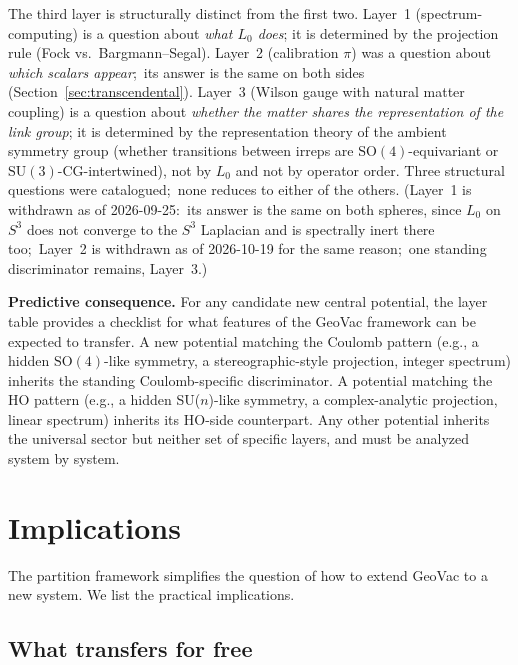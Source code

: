 \documentclass[twocolumn,pra,amsmath,amssymb,superscriptaddress]{revtex4-2}
\begin{document}
The third layer is structurally distinct from the first two.  Layer~1
(spectrum-computing) is a question about \emph{what $L_0$ does}; it
is determined by the projection rule (Fock vs.\ Bargmann--Segal).
Layer~2 (calibration $\pi$) was a question about \emph{which scalars
appear};\ its answer is the same on both sides
(Section~\ref{sec:transcendental}).  Layer~3 (Wilson gauge with
natural matter coupling) is a question about \emph{whether the matter
shares the representation of the link group}; it is determined by the
representation theory of the ambient symmetry group (whether
transitions between irreps are $\mathrm{SO}(4)$-equivariant or
$\mathrm{SU}(3)$-CG-intertwined), not by $L_0$ and not by operator
order.  Three structural questions were catalogued;\ none reduces to
either of the others.  (Layer~1 is withdrawn as of 2026-09-25:\ its
answer is the same on both spheres, since $L_0$ on $S^3$ does not
converge to the $S^3$ Laplacian and is spectrally inert there too;\
Layer~2 is withdrawn as of 2026-10-19 for the same reason;\ one
standing discriminator remains, Layer~3.)

\medskip\noindent\textbf{Predictive consequence.}  For any candidate
new central potential, the layer table provides a checklist
for what features of the GeoVac framework can be expected to
transfer.  A new potential matching the Coulomb pattern (e.g., a
hidden $\mathrm{SO}(4)$-like symmetry, a stereographic-style
projection, integer spectrum) inherits the standing Coulomb-specific
discriminator.  A potential matching the HO pattern (e.g., a hidden
SU($n$)-like symmetry, a complex-analytic projection, linear
spectrum) inherits its HO-side counterpart.  Any other potential
inherits the universal sector but neither set of specific layers,
and must be analyzed system by system.

\section{Implications}
\label{sec:implications}

The partition framework simplifies the question of how to extend
GeoVac to a new system.  We list the practical implications.

\subsection{What transfers for free}
\end{document}
